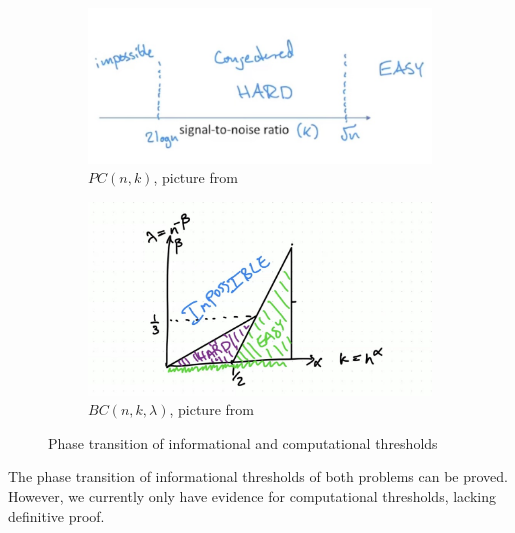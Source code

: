 \begin{figure}
    \centering
    \begin{subfigure}[b]{0.3\textwidth}
        \centering
        \includegraphics[width=\textwidth]{pc.jpg}
        \caption{$PC(n,k)$, picture from \cite{info_comp_alg_equiv}}
        \label{pc_threshold}
    \end{subfigure}
    \hspace{3cm}
    \begin{subfigure}[b]{0.3\textwidth}
        \centering
        \includegraphics[width=\textwidth]{bc.jpg}
        \caption{$BC(n,k,\lambda)$, picture from \cite{avg_redu_1}}
        \label{bc_threshold}
    \end{subfigure}
    \caption{Phase transition of informational and computational thresholds}
    \label{pc_bc_threshold}
\end{figure}
The phase transition of informational thresholds of both problems can be proved. However, we currently only have evidence for computational thresholds, lacking definitive proof.
